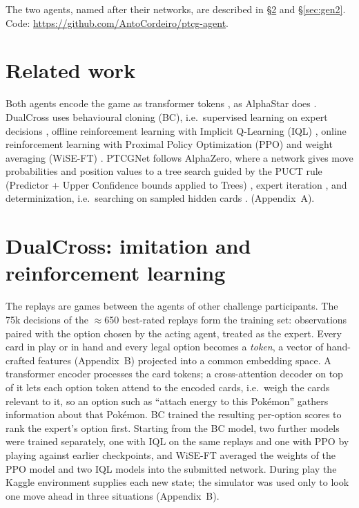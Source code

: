 \documentclass{article}
\begin{document}
The two agents, named after their networks, are described in \S\ref{sec:gen1} and \S\ref{sec:gen2}. Code: \url{https://github.com/AntoCordeiro/ptcg-agent}.

\section{Related work}\label{sec:related}
Both agents encode the game as transformer tokens \cite{vaswani2017attention}, as AlphaStar does \cite{vinyals2019grandmaster}. DualCross uses behavioural cloning (BC), i.e.\ supervised learning on expert decisions \cite{pomerleau1991efficient}, offline reinforcement learning with Implicit Q-Learning (IQL) \cite{kostrikov2022offline}, online reinforcement learning with Proximal Policy Optimization (PPO) \cite{schulman2017proximal} and weight averaging (WiSE-FT) \cite{wortsman2022robust}. PTCGNet follows AlphaZero, where a network gives move probabilities and position values to a tree search guided by the PUCT rule (Predictor + Upper Confidence bounds applied to Trees) \cite{silver2016mastering,silver2018general}, expert iteration \cite{anthony2017thinking}, and determinization, i.e.\ searching on sampled hidden cards \cite{long2010understanding,cowling2012information}. (Appendix~A).

\section{DualCross: imitation and reinforcement learning}\label{sec:gen1}
The replays are games between the agents of other challenge participants. The 75k decisions of the $\approx$650 best-rated replays form the training set: observations paired with the option chosen by the acting agent, treated as the expert. Every card in play or in hand and every legal option becomes a \emph{token}, a vector of hand-crafted features (Appendix~B) projected into a common embedding space. A transformer encoder processes the card tokens; a cross-attention decoder on top of it lets each option token attend to the encoded cards, i.e.\ weigh the cards relevant to it, so an option such as ``attach energy to this Pok\'emon'' gathers information about that Pok\'emon. BC trained the resulting per-option scores to rank the expert's option first. Starting from the BC model, two further models were trained separately, one with IQL on the same replays and one with PPO by playing against earlier checkpoints, and WiSE-FT averaged the weights of the PPO model and two IQL models into the submitted network. During play the Kaggle environment supplies each new state; the simulator was used only to look one move ahead in three situations (Appendix~B).
\end{document}
